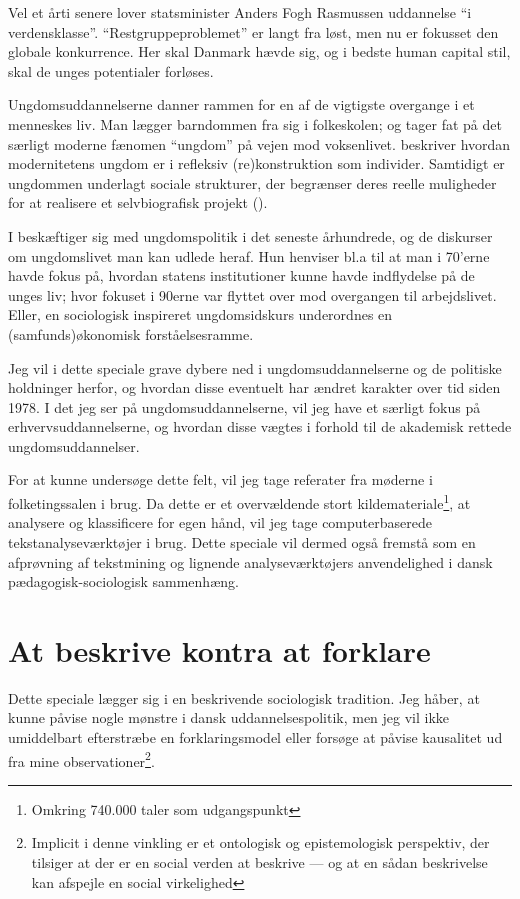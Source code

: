  Vel et årti senere lover statsminister Anders Fogh Rasmussen uddannelse “i verdensklasse”. “Restgruppeproblemet” er langt fra løst, men nu er fokusset den globale konkurrence.
 Her skal Danmark hævde sig, og i bedste human capital stil, skal de unges potentialer forløses.

 Ungdomsuddannelserne danner rammen for en af de vigtigste overgange i et menneskes liv.
 Man lægger barndommen fra sig i folkeskolen; og tager fat på det særligt moderne fænomen “ungdom” på vejen mod voksenlivet.
 \citeauthor{juulDiskurserOmUngdom2013} beskriver hvordan modernitetens ungdom er i refleksiv (re)konstruktion som individer.
 Samtidigt er ungdommen underlagt sociale strukturer, der begrænser deres reelle muligheder for at realisere et selvbiografisk projekt (\citeyear[s. 11]{juulDiskurserOmUngdom2013}).

I  beskæftiger \citeauthor{juulDiskurserOmUngdom2013} sig med ungdomspolitik i det seneste århundrede, og de diskurser om ungdomslivet man kan udlede heraf.
Hun henviser bl.a til at man i 70'erne havde fokus på, hvordan statens institutioner kunne havde indflydelse på de unges liv; hvor fokuset i 90erne var flyttet over mod overgangen til arbejdslivet.
Eller, en sociologisk inspireret ungdomsidskurs underordnes en (samfunds)økonomisk forståelsesramme.

Jeg vil i dette speciale grave dybere ned i ungdomsuddannelserne og de politiske holdninger herfor, og hvordan disse eventuelt har ændret karakter over tid siden 1978.
I det jeg ser på ungdomsuddannelserne, vil jeg have et særligt fokus på erhvervsuddannelserne, og hvordan disse vægtes i forhold til de akademisk rettede ungdomsuddannelser.

For at kunne undersøge dette felt, vil jeg tage referater fra møderne i folketingssalen i brug.
Da dette er et overvældende stort kildemateriale\footnote{Omkring 740.000 taler som udgangspunkt}, at analysere og klassificere for egen hånd, vil jeg tage computerbaserede tekstanalyseværktøjer i brug.
Dette speciale vil dermed også fremstå som en afprøvning af tekstmining og lignende analyseværktøjers anvendelighed i dansk pædagogisk-sociologisk sammenhæng.

\section{At beskrive kontra at forklare}\label{sec:beskrive}

Dette speciale lægger sig i en beskrivende sociologisk tradition.
Jeg håber, at kunne påvise nogle mønstre i dansk uddannelsespolitik, men jeg vil ikke umiddelbart efterstræbe en forklaringsmodel eller forsøge at påvise kausalitet ud fra mine observationer\footnote{Implicit i denne vinkling er et ontologisk og epistemologisk perspektiv, der tilsiger at der er en social verden at beskrive — og at en sådan beskrivelse kan afspejle en social virkelighed}.

